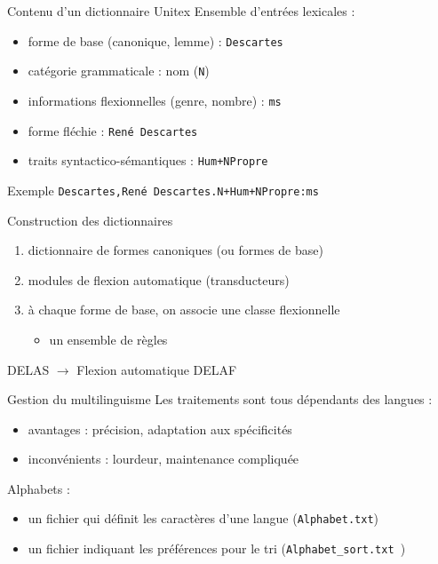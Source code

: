 \documentclass[xetex,xcolor={table,usenames,dvipsnames}]{beamer}
\begin{document}
\begin{frame}{Contenu d'un dictionnaire Unitex}
	Ensemble d'entrées lexicales :
	\begin{itemize}
		\item forme de base (canonique, lemme) : \texttt{Descartes}
		\item catégorie grammaticale : nom (\texttt{N})
		\item informations flexionnelles (genre, nombre) : \texttt{ms}
		\item forme fléchie : \texttt{René Descartes}
		\item traits syntactico-sémantiques : \texttt{Hum+NPropre}
	\end{itemize}
	
	
	\begin{block}{Exemple}
		\justifying
		\texttt{Descartes,René Descartes.N+Hum+NPropre:ms}
	\end{block}
\end{frame}


\begin{frame}{Construction des dictionnaires}
	\begin{enumerate}
		\item dictionnaire de formes canoniques (ou formes de base)
		\item modules de flexion automatique (transducteurs)
		\item à chaque forme de base, on associe une classe flexionnelle \begin{itemize}
			\item un ensemble de règles
		\end{itemize}
	\end{enumerate}
	
	\begin{center}
		\textsc{DELAS} $\rightarrow$ Flexion automatique \textsc{DELAF}
	\end{center}
\end{frame}


\begin{frame}{Gestion du multilinguisme}
	Les traitements sont tous dépendants des langues :
	\begin{itemize}
		\item avantages : précision, adaptation aux spécificités
		\item inconvénients : lourdeur, maintenance compliquée
	\end{itemize}
	Alphabets : 
	\begin{itemize}
		\item un fichier qui définit les caractères d'une langue (\texttt{Alphabet.txt})
		\item un fichier indiquant les préférences pour le tri (\texttt{Alphabet\_sort.txt })
	\end{itemize}
\end{frame}
\end{document}
